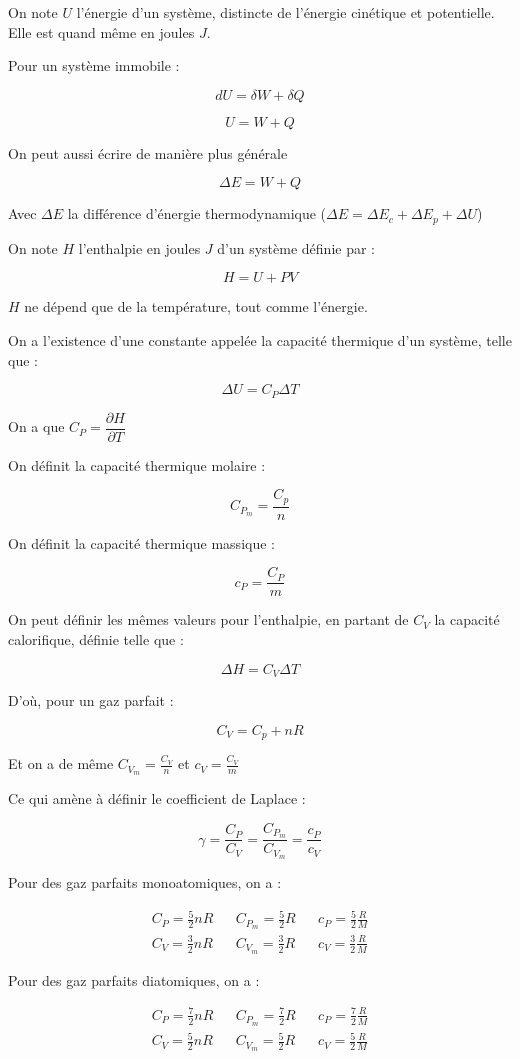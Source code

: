 \documentclass[a4paper,12pt]{book}
\newcommand{\Def}[2]{\begin{tcolorbox}[colback=white,colframe=red!10!green!20!blue!75!, title=Définition : #1]#2\end{tcolorbox}}
\newcommand{\Thr}[2]{\begin{tcolorbox}[sharp corners, colback=white,colframe=red!10!blue!30!green!75!, title=Théorème : #1]#2\end{tcolorbox}}
\begin{document}
\Def{}{On note $U$ l'énergie d'un système, distincte de l'énergie cinétique et potentielle. Elle est quand même en joules $J$.}
\Thr{Premier principe de la thermodynamique}{Pour un système immobile :
\par $$dU = \delta W + \delta Q$$
\par $$U = W+Q$$
\par On peut aussi écrire de manière plus générale
\par $$\Delta E = W+Q$$
\par Avec $\Delta E$ la différence d'énergie thermodynamique ($\Delta E = \Delta E_c+\Delta E_p+\Delta U$)}
\Def{Enthalpie}{On note $H$ l'enthalpie en joules $J$ d'un système définie par :
\par $$H=U+PV$$
\par $H$ ne dépend que de la température, tout comme l'énergie.}
\Thr{Lois de Joule}{On a l'existence d'une constante appelée la capacité thermique d'un système, telle que :
\par $$\Delta U = C_P\Delta T$$
\par On a que $C_P = \dfrac{\partial H}{\partial T}$
\par On définit la capacité thermique molaire :
\par $$C_{P_m} = \frac{C_p}{n}$$
\par On définit la capacité thermique massique :
\par $$c_P = \frac{C_P}{m}$$
\par On peut définir les mêmes valeurs pour l'enthalpie, en partant de $C_V$ la capacité calorifique, définie telle que :
\par $$\Delta H = C_V\Delta T$$
\par D'où, pour un gaz parfait :
\par $$C_V = C_p+nR$$
\par Et on a de même $C_{V_m}=\frac{C_V}{n}$ et $c_V=\frac{C_V}{m}$
\par Ce qui amène à définir le coefficient de Laplace : 
\par $$\gamma=\frac{C_P}{C_V}=\frac{C_{P_m}}{C_{V_m}} =\frac{c_P}{c_V}$$}
\Thr{Pour un gaz parfait}{Pour des gaz parfaits monoatomiques, on a :
\par \begin{align*} C_P = \frac{5}{2}nR & & C_{P_m} = \frac{5}{2}R & & c_P = \frac{5}{2}\frac{R}{M}\\
C_V = \frac{3}{2}nR & & C_{V_m} = \frac{3}{2}R & & c_V = \frac{3}{2}\frac{R}{M}
\end{align*}
\par Pour des gaz parfaits diatomiques, on a :
\par \begin{align*} C_P = \frac{7}{2}nR & & C_{P_m} = \frac{7}{2}R & & c_P = \frac{7}{2}\frac{R}{M}\\
C_V = \frac{5}{2}nR & & C_{V_m} = \frac{5}{2}R & & c_V = \frac{5}{2}\frac{R}{M}
\end{align*}}
\end{document}
